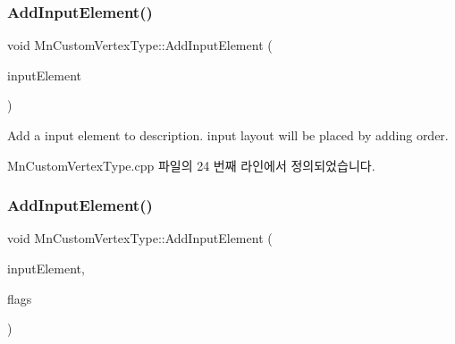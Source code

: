 \mbox{\label{class_m_n_l_1_1_mn_custom_vertex_type_add19b1562c7ce78121b1e7ef79f8a614}} 
\subsubsection{\texorpdfstring{Add\+Input\+Element()}{AddInputElement()}\hspace{0.1cm}{\footnotesize\ttfamily [1/2]}}
{\footnotesize\ttfamily void Mn\+Custom\+Vertex\+Type\+::\+Add\+Input\+Element (\begin{DoxyParamCaption}\item[{const \hyperlink{class_m_n_l_1_1_mn_input_element}{Mn\+Input\+Element} \&}]{input\+Element }\end{DoxyParamCaption})}

Add a input element to description. input layout will be placed by adding order. 

Mn\+Custom\+Vertex\+Type.\+cpp 파일의 24 번째 라인에서 정의되었습니다.

\mbox{\label{class_m_n_l_1_1_mn_custom_vertex_type_af8dca54222b2c1e264ea7c1ec9ae8a18}} 
\subsubsection{\texorpdfstring{Add\+Input\+Element()}{AddInputElement()}\hspace{0.1cm}{\footnotesize\ttfamily [2/2]}}
{\footnotesize\ttfamily void Mn\+Custom\+Vertex\+Type\+::\+Add\+Input\+Element (\begin{DoxyParamCaption}\item[{const \hyperlink{class_m_n_l_1_1_mn_input_element}{Mn\+Input\+Element} \&}]{input\+Element,  }\item[{\hyperlink{namespace_m_n_l_a37da403537a061d6aaa45b7d30f29ac2}{M\+N\+\_\+\+C\+U\+S\+T\+O\+M\+\_\+\+V\+E\+R\+T\+E\+X\+\_\+\+F\+L\+AG}}]{flags }\end{DoxyParamCaption})}

